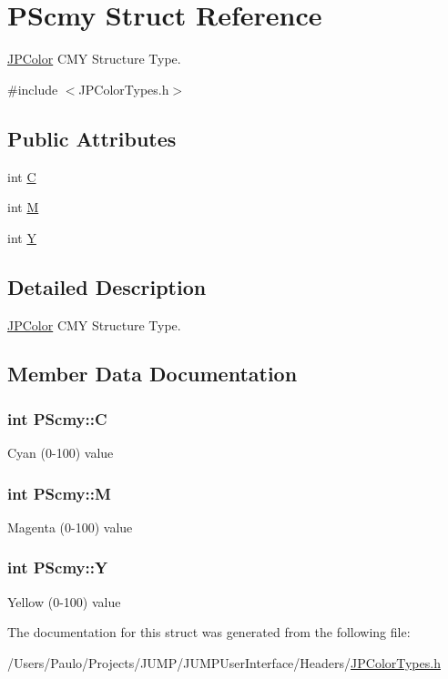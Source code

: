 \hypertarget{struct_p_scmy}{
\section{PScmy Struct Reference}
\label{struct_p_scmy}
}


\hyperlink{interface_j_p_color}{JPColor} CMY Structure Type.  




{\ttfamily \#include $<$JPColorTypes.h$>$}

\subsection*{Public Attributes}
\begin{DoxyCompactItemize}
\item 
int \hyperlink{struct_p_scmy_a69f6843a07e9415a3625c793f45aa72b}{C}
\item 
int \hyperlink{struct_p_scmy_a1f9a431e5ae13eb7c56a53a2313eed03}{M}
\item 
int \hyperlink{struct_p_scmy_ae9c17138bfef9e06791440ba8dc3a2a7}{Y}
\end{DoxyCompactItemize}


\subsection{Detailed Description}
\hyperlink{interface_j_p_color}{JPColor} CMY Structure Type. 

\subsection{Member Data Documentation}
\hypertarget{struct_p_scmy_a69f6843a07e9415a3625c793f45aa72b}{
\subsubsection[{C}]{\setlength{\rightskip}{0pt plus 5cm}int {\bf PScmy::C}}}
\label{struct_p_scmy_a69f6843a07e9415a3625c793f45aa72b}
Cyan (0-\/100) value \hypertarget{struct_p_scmy_a1f9a431e5ae13eb7c56a53a2313eed03}{
\subsubsection[{M}]{\setlength{\rightskip}{0pt plus 5cm}int {\bf PScmy::M}}}
\label{struct_p_scmy_a1f9a431e5ae13eb7c56a53a2313eed03}
Magenta (0-\/100) value \hypertarget{struct_p_scmy_ae9c17138bfef9e06791440ba8dc3a2a7}{
\subsubsection[{Y}]{\setlength{\rightskip}{0pt plus 5cm}int {\bf PScmy::Y}}}
\label{struct_p_scmy_ae9c17138bfef9e06791440ba8dc3a2a7}
Yellow (0-\/100) value 

The documentation for this struct was generated from the following file:\begin{DoxyCompactItemize}
\item 
/Users/Paulo/Projects/JUMP/JUMPUserInterface/Headers/\hyperlink{_j_p_color_types_8h}{JPColorTypes.h}\end{DoxyCompactItemize}
